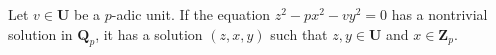 Let $v \in \mathbf{U}$ be a $p$-adic unit. If the equation $z^2 - p x^2 - v y^2 = 0$ has a nontrivial solution in $\mathbf{Q}_p$, it has a solution $(z, x, y)$ such that $z, y \in \mathbf{U}$ and $x \in \mathbf{Z}_p$.
